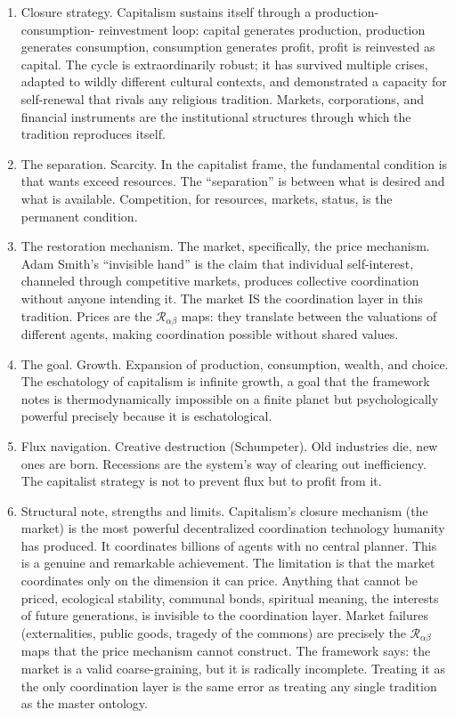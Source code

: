 \documentclass[
]{article}
\begin{document}
\begin{enumerate}
\def\labelenumi{\arabic{enumi}.}
\setcounter{enumi}{82}
\item
  Closure strategy. Capitalism sustains itself through a
  production-consumption- reinvestment loop: capital generates
  production, production generates consumption, consumption generates
  profit, profit is reinvested as capital. The cycle is extraordinarily
  robust; it has survived multiple crises, adapted to wildly different
  cultural contexts, and demonstrated a capacity for self-renewal that
  rivals any religious tradition. Markets, corporations, and financial
  instruments are the institutional structures through which the
  tradition reproduces itself.
\item
  The separation. Scarcity. In the capitalist frame, the fundamental
  condition is that wants exceed resources. The ``separation'' is
  between what is desired and what is available. Competition, for
  resources, markets, status, is the permanent condition.
\item
  The restoration mechanism. The market, specifically, the price
  mechanism. Adam Smith's ``invisible hand'' is the claim that
  individual self-interest, channeled through competitive markets,
  produces collective coordination without anyone intending it. The
  market IS the coordination layer in this tradition. Prices are the
  \(\mathcal{R}_{\alpha\beta}\) maps: they translate between the
  valuations of different agents, making coordination possible without
  shared values.
\item
  The goal. Growth. Expansion of production, consumption, wealth, and
  choice. The eschatology of capitalism is infinite growth, a goal that
  the framework notes is thermodynamically impossible on a finite planet
  but psychologically powerful precisely because it is eschatological.
\item
  Flux navigation. Creative destruction (Schumpeter). Old industries
  die, new ones are born. Recessions are the system's way of clearing
  out inefficiency. The capitalist strategy is not to prevent flux but
  to profit from it.
\item
  Structural note, strengths and limits. Capitalism's closure mechanism
  (the market) is the most powerful decentralized coordination
  technology humanity has produced. It coordinates billions of agents
  with no central planner. This is a genuine and remarkable achievement.
  The limitation is that the market coordinates only on the dimension it
  can price. Anything that cannot be priced, ecological stability,
  communal bonds, spiritual meaning, the interests of future
  generations, is invisible to the coordination layer. Market failures
  (externalities, public goods, tragedy of the commons) are precisely
  the \(\mathcal{R}_{\alpha\beta}\) maps that the price mechanism cannot
  construct. The framework says: the market is a valid coarse-graining,
  but it is radically incomplete. Treating it as the only coordination
  layer is the same error as treating any single tradition as the master
  ontology.
\end{enumerate}
\end{document}
